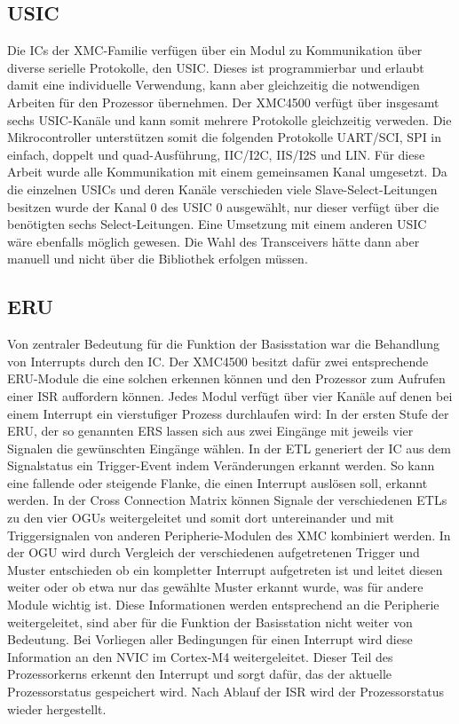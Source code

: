 \subsection{USIC}
Die \acp{IC} der XMC-Familie verfügen über ein Modul zu Kommunikation über diverse serielle Protokolle, den \ac{USIC}. Dieses ist programmierbar und erlaubt damit eine individuelle Verwendung, kann aber gleichzeitig die notwendigen Arbeiten für den Prozessor übernehmen. Der XMC4500 verfügt über insgesamt sechs \ac{USIC}-Kanäle und kann somit mehrere Protokolle gleichzeitig verweden. Die Mikrocontroller unterstützen somit die folgenden Protokolle UART/SCI, SPI in einfach, doppelt und quad-Ausführung, IIC/I2C, IIS/I2S und LIN. Für diese Arbeit wurde alle Kommunikation mit einem gemeinsamen Kanal umgesetzt. Da die einzelnen \acp{USIC} und deren Kanäle verschieden viele Slave-Select-Leitungen besitzen wurde der Kanal $0$ des \ac{USIC} $0$ ausgewählt, nur dieser verfügt über die benötigten sechs Select-Leitungen. Eine Umsetzung mit einem anderen USIC wäre ebenfalls möglich gewesen. Die Wahl des Transceivers hätte dann aber manuell und nicht über die Bibliothek erfolgen müssen.
\subsection{ERU}
Von zentraler Bedeutung für die Funktion der Basisstation war die Behandlung von Interrupts durch den  \ac{IC}. Der XMC4500 besitzt dafür zwei entsprechende \ac{ERU}-Module die eine solchen erkennen können und den Prozessor zum Aufrufen einer \ac{ISR} auffordern können. Jedes Modul verfügt über vier Kanäle auf denen  bei einem Interrupt ein vierstufiger Prozess durchlaufen wird: In der ersten Stufe der \ac{ERU}, der so genannten \ac{ERS} lassen sich aus zwei Eingänge mit jeweils vier Signalen die gewünschten Eingänge wählen. In der \ac{ETL} generiert der \ac{IC} aus dem Signalstatus ein Trigger-Event indem Veränderungen erkannt werden. So kann eine fallende oder steigende Flanke, die einen Interrupt auslösen soll, erkannt werden. In der Cross Connection Matrix können Signale der verschiedenen \acp{ETL} zu den vier \acp{OGU} weitergeleitet und somit dort untereinander und mit Triggersignalen von anderen Peripherie-Modulen des XMC kombiniert werden.  In der \ac{OGU} wird durch Vergleich der verschiedenen aufgetretenen Trigger und Muster entschieden ob ein kompletter Interrupt aufgetreten ist und leitet diesen weiter oder ob etwa nur das gewählte Muster erkannt wurde, was für andere Module wichtig ist. Diese Informationen werden entsprechend an die Peripherie weitergeleitet, sind aber für die Funktion der Basisstation nicht weiter von Bedeutung. 
Bei Vorliegen aller Bedingungen für einen Interrupt wird diese Information an den \ac{NVIC} im Cortex-M4 weitergeleitet. Dieser Teil des Prozessorkerns erkennt den Interrupt und sorgt dafür, das der aktuelle Prozessorstatus gespeichert wird. Nach Ablauf der \ac{ISR} wird der Prozessorstatus wieder hergestellt.
